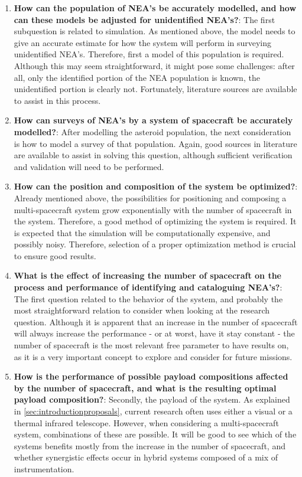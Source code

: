 \begin{enumerate}
 \item \textbf{How can the population of NEA's be accurately modelled, and how can these models be adjusted for unidentified NEA's?}: The first subquestion is related to simulation. As mentioned above, the model needs to give an accurate estimate for how the system will perform in surveying unidentified NEA's. Therefore, first a model of this population is required. Although this may seem straightforward, it might pose some challenges: after all, only the identified portion of the NEA population is known, the unidentified portion is clearly not. Fortunately, literature sources are available to assist in this process.
 \item \textbf{How can surveys of NEA's by a system of spacecraft be accurately modelled?}: After modelling the asteroid population, the next consideration is how to model a survey of that population. Again, good sources in literature are available to assist in solving this question, although sufficient verification and validation will need to be performed.
 \item \textbf{How can the position and composition of the system be optimized?}: Already mentioned above, the possibilities for positioning and composing a multi-spacecraft system grow exponentially with the number of spacecraft in the system. Therefore, a good method of optimizing the system is required. It is expected that the simulation will be computationally expensive, and possibly noisy. Therefore, selection of a proper optimization method is crucial to ensure good results.
 \item \textbf{What is the effect of increasing the number of spacecraft on the process and performance of identifying and cataloguing NEA's?}: The first question related to the behavior of the system, and probably the most straightforward relation to consider when looking at the research question. Although it is apparent that an increase in the number of spacecraft will always increase the performance - or at worst, have it stay constant - the number of spacecraft is the most relevant free parameter to have results on, as it is a very important concept to explore and consider for future missions.
 \item \textbf{How is the performance of possible payload compositions affected by the number of spacecraft, and what is the resulting optimal payload composition?}: Secondly, the payload of the system. As explained in \autoref{sec:introductionproposals}, current research often uses either a visual or a thermal infrared telescope. However, when considering a multi-spacecraft system, combinations of these are possible. It will be good to see which of the systems benefits mostly from the increase in the number of spacecraft, and whether synergistic effects occur in hybrid systems composed of a mix of instrumentation. 

\end{enumerate}
